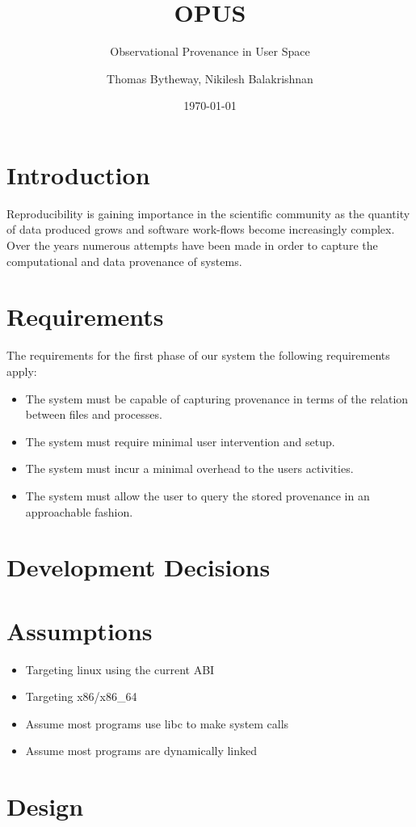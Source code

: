 \documentclass[10pt]{scrartcl}
\title{OPUS}
\subtitle{Observational Provenance in User Space}
\date{\today}
\author{Thomas Bytheway, Nikilesh Balakrishnan}
\begin{document}
\maketitle
\section{Introduction}
Reproducibility is gaining importance in the scientific community as the quantity of data produced grows and software work-flows become increasingly complex. Over the years numerous attempts have been made in order to capture the computational and data provenance of systems.


\section{Requirements}
The requirements for the first phase of our system the following requirements apply:
\begin{itemize}
\item The system must be capable of capturing provenance in terms of the relation between files and processes.
\item The system must require minimal user intervention and setup.
\item The system must incur a minimal overhead to the users activities.
\item The system must allow the user to query the stored provenance in an approachable fashion.
\end{itemize}

\section{Development Decisions}



\section{Assumptions}
\begin{itemize}
\item Targeting linux using the current ABI
\item Targeting x86/x86\_64
\item Assume most programs use libc to make system calls
\item Assume most programs are dynamically linked
\end{itemize}

\section{Design}
\end{document}
